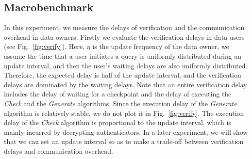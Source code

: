 

\subsection{Macrobenchmark}
In this experiment, we measure the delays of verification and the communication overhead in data owners. %
Firstly we evaluate the verification delays in data users (see Fig.~\ref{fig:verify}). Here, $\eta$ is the update frequency of the data owner, we assume the time that a user initiates a query is uniformly distributed during an update interval, and then the user's waiting delays are also uniformly distributed. Therefore, the expected delay is half of the update interval, and the verification delays are dominated by the waiting delays. Note that an entire verification delay includes the delay of waiting for a checkpoint and the delay of executing the {\it Check} and the {\it Generate} algorithms. Since the execution delay of the {\it Generate} algorithm is relatively stable, we do not plot it in Fig.~\ref{fig:verify}. The execution delay of the {\it Check} algorithm is proportional to the update interval, which is mainly incurred by decrypting authenticators. In a later experiment, we will show that we can set an update interval so as to make a trade-off between verification delays and communication overhead.
